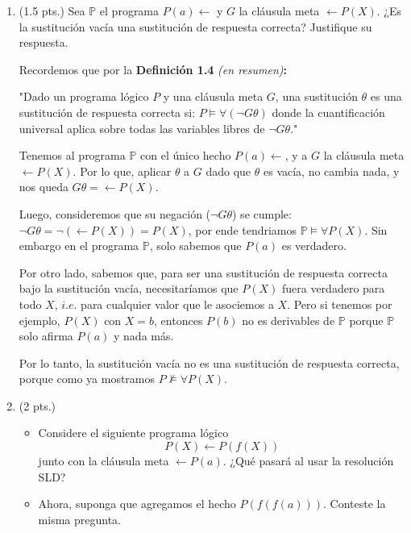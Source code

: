 \documentclass[12pt,letterpaper]{article}
\newcommand{\dmp}{\leftarrow}
\begin{document}
\begin{enumerate}

\item (1.5 pts.) Sea $\mathbb{P}$ el programa $P(a)\dmp$ y $G$ la cláusula meta $\dmp P(X)$. ¿Es la sustitución vacía una sustitución de respuesta correcta? Justifique su respuesta.
  
  \medskip

  Recordemos que por la \textbf{Definición 1.4} \textit{(en resumen)}\textbf{:}
  
  "Dado un programa lógico $P$ y una cláusula meta $G$, una sustitución $\theta$ es una sustitución de respuesta correcta si: $P \vDash \forall (\neg G\theta )$ donde la cuantificación universal aplica sobre todas las variables libres de $\neg G\theta.$"
  
  Tenemos al programa $\mathbb{P}$ con el \'{u}nico hecho $P(a) \dmp$, y a $G$ la cl\'{a}usula meta $\dmp P(X)$. Por lo que, aplicar $\theta$ a $G$ dado que $\theta$ es vacía, no cambia nada, y nos queda $G \theta = \dmp P(X)$.

  
  Luego, consideremos que su negación ($\neg G \theta$) se cumple: $\neg G \theta = \neg(\dmp P(X)) = P(X)$, por ende tendriamos $\mathbb{P} \vDash \forall P(X)$. Sin embargo en el programa $\mathbb{P}$, solo sabemos que $P(a)$ es verdadero.

  Por otro lado, sabemos que, para ser una sustitución de respuesta correcta bajo la sustitución vacía, necesitaríamos que $P(X)$ fuera verdadero para todo $X$, $i.e.$ para cualquier valor que le asociemos a $X$. Pero si tenemos por ejemplo, $P(X)$ con $X = b$, entonces $P(b)$ no es derivables de $\mathbb{P}$ porque $\mathbb{P}$ solo afirma $P(a)$ y nada m\'{a}s.
  
  Por lo tanto, la sustitución vacía no es una sustitución de respuesta correcta, porque como ya mostramos $P \nvDash \forall P(X)$.
  \bigskip
  
\item (2 pts.) 
  \begin{itemize}
  \item Considere el siguiente programa lógico
    \[
    P(X) \leftarrow P(f(X))
    \]
    junto con la cláusula meta $\leftarrow P(a)$. ¿Qué pasará al usar la resolución SLD?

  \item Ahora, suponga que agregamos el hecho $P(f(f(a)))$. Conteste la misma pregunta.
  \end{itemize}


\end{enumerate}
\end{document}
